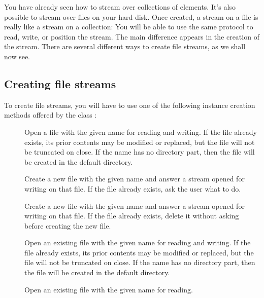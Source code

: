 \documentclass[a4paper,10pt,twoside]{book}
\begin{document}
You have already seen how to stream over collections of elements.
It's also possible to stream over files on your hard disk.
Once created, a stream on a file is really like a stream on a collection:
You will be able to use the same protocol to read, write, or position the stream.
The main difference appears in the creation of the stream.
There are several different ways to create file streams, as we shall now see.

\subsection{Creating file streams}
\label{sec:creat-file-stre}

To create file streams, you will have to use one of the following instance creation methods offered by the class :

\begin{description}

\item[]
  Open a file with the given name for reading and writing.
  If the file already exists, its prior contents may be modified or replaced, but the file will not be truncated on close.
  If the name has no directory part, then the file will be created in the default directory.
	
\item[]
  Create a new file with the given name and answer a stream opened for writing on that file.
  If the file already exists, ask the user what to do.
	
\item[]
  Create a new file with the given name and answer a stream opened for writing on that file.
  If the file already exists, delete it without asking before creating the new file.

\item[]
  Open an existing file with the given name for reading and writing.
  If the file already exists, its prior contents may be modified or replaced, but the file will not be truncated on close.
  If the name has no directory part, then the file will be created in the default directory.

\item[] Open an existing file with the
	given name for reading.

\end{description}
\end{document}
